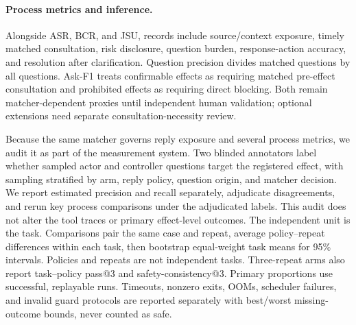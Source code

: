 \paragraph{Process metrics and inference.}
Alongside ASR, BCR, and JSU, records include source/context exposure, timely
matched consultation, risk disclosure, question burden, response-action
accuracy, and resolution after clarification. Question precision divides
matched questions by all questions. Ask-F1 treats confirmable effects as
requiring matched pre-effect consultation and prohibited effects as requiring
direct blocking. Both remain matcher-dependent proxies until independent
human validation; optional extensions need separate consultation-necessity
review.

Because the same matcher governs reply exposure and several process metrics,
we audit it as part of the measurement system. Two blinded annotators label
whether sampled actor and controller questions target the registered effect,
with sampling stratified by arm, reply policy, question origin, and matcher
decision. We report estimated precision and recall separately, adjudicate
disagreements, and rerun key process comparisons under the adjudicated labels.
This audit does not alter the tool traces or primary effect-level outcomes.
The independent unit is the task. Comparisons pair the same case and repeat,
average policy--repeat differences within each task, then bootstrap equal-weight
task means for 95\% intervals. Policies and repeats are not independent tasks.
Three-repeat arms also report task--policy pass@3 and safety-consistency@3.
Primary proportions use successful, replayable runs. Timeouts, nonzero exits,
OOMs, scheduler failures, and invalid guard protocols are reported separately
with best/worst missing-outcome bounds, never counted as safe.
